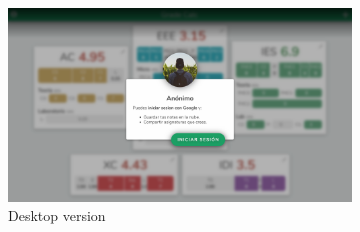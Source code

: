 \vfill
\begin{figure}[ht!]
    \begin{subfigure}[b]{0.757\textwidth-0.1cm}
        \centering
        \includegraphics[width=\textwidth]{media/screenshots/screenshot-login-pc.png}
        \caption{Desktop version}
    \end{subfigure}
    \hfill
    \begin{subfigure}[b]{0.243\textwidth-0.1cm}
        \centering

\end{subfigure}
\end{figure}
